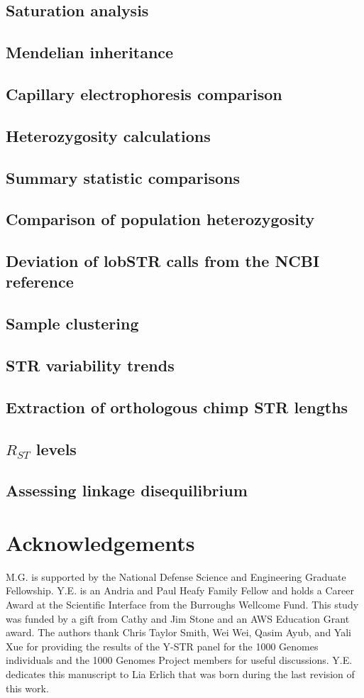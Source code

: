 \subsection{Saturation analysis}
\subsection{Mendelian inheritance}
\subsection{Capillary electrophoresis comparison}
\subsection{Heterozygosity calculations}
\subsection{Summary statistic comparisons}
\subsection{Comparison of population heterozygosity}
\subsection{Deviation of lobSTR calls from the NCBI reference}
\subsection{Sample clustering}
\subsection{STR variability trends}
\subsection{Extraction of orthologous chimp STR lengths}
\subsection{$R_{ST}$ levels}
\subsection{Assessing linkage disequilibrium}



\section{Acknowledgements}
M.G. is supported by the National Defense Science and Engineering Graduate Fellowship. Y.E. is an Andria and Paul Heafy Family Fellow and holds a Career Award at the Scientific Interface from the Burroughs Wellcome Fund. This study was funded by a gift from Cathy and Jim Stone and an AWS Education Grant award. The authors thank Chris Taylor Smith, Wei Wei, Qasim Ayub, and Yali Xue for providing the results of the Y-STR panel for the 1000 Genomes individuals and the 1000 Genomes Project members for useful discussions. Y.E. dedicates this manuscript to Lia Erlich that was born during the last revision of this work.